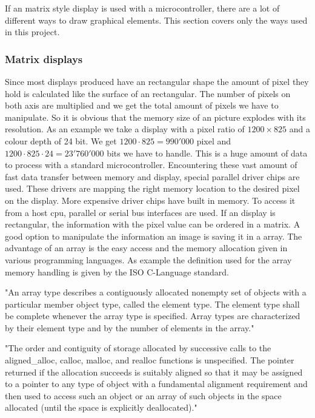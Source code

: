 
If an matrix style display is used with a microcontroller, there are a lot of different ways to draw graphical elements. This section covers only the ways used in this project. 

\subsubsection{Matrix displays}

Since most displays produced have an rectangular shape the amount of pixel they hold is calculated like the surface of an rectangular. The number of pixels on both axis are multiplied and we get the total amount of pixels we have to manipulate. So it is obvious that the memory size of an picture explodes with its resolution. As an example we take a display with a pixel ratio of $1200 \times 825$ and a colour depth of 24 bit. We get $1200\cdot825=990'000$ pixel and $1200\cdot825\cdot24=23'760'000$ bits we have to handle. This is a huge amount of data to process with a standard microcontroller. Encountering these vast amount of fast data transfer between memory and display, special parallel driver chips are used. These drivers are mapping the right memory location to the desired pixel on the display. More expensive driver chips have built in memory. To access it from a host cpu, parallel or serial bus interfaces are used. If an display is rectangular, the information with the pixel value can be ordered in a matrix. A good option to manipulate the information an image is saving it in a array. The advantage of an array is the easy access and the memory allocation given in various programming languages. As example the definition used for the array memory handling is given by the ISO C-Language standard. 


\begin{displayquote}
	"An array type describes a contiguously allocated nonempty set of objects with a particular member object type, called the element type. The element type shall be complete whenever the array type is specified. Array types are characterized by their element type and by the number of elements in the array."
\end{displayquote}\cite{ISO/IEC9899}

\begin{displayquote}
	"The order and contiguity of storage allocated by successive calls to the aligned\_alloc, calloc, malloc, and realloc functions is unspecified. The pointer returned if the allocation succeeds is suitably aligned so that it may be assigned to a pointer to any type of object with a fundamental alignment requirement and then used to access such an object or an array of such objects in the space allocated (until the space is explicitly deallocated)."
\end{displayquote}\cite{ISO/IEC9899}

